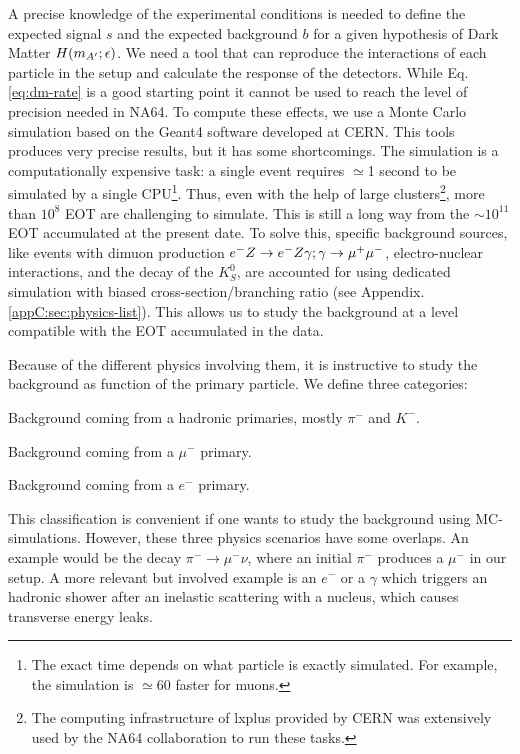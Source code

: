 A precise knowledge of the experimental conditions is needed to define the expected signal $s$ and the expected background $b$ for a given hypothesis of Dark Matter $H(m_{A'};\epsilon)$. We need a tool that can reproduce the interactions of each particle in the setup and calculate the response of the detectors. While Eq.\ref{eq:dm-rate} is a good starting point it cannot be used to reach the level of precision needed in NA64. To compute these effects, we use a Monte Carlo simulation based on the Geant4 software \cite{AGOSTINELLI2003250,1610988} developed at CERN. This tools produces very precise results, but it has some shortcomings. The simulation is a computationally expensive task: a single event requires $\simeq$1 second to be simulated by a single CPU\footnote{The exact time depends on what particle is exactly simulated. For example, the simulation is $\simeq$60 faster for muons.}. Thus, even with the help of large clusters\footnote{The computing infrastructure of lxplus provided by CERN was extensively used by the NA64 collaboration to run these tasks.}, more than $10^8$ EOT are challenging to simulate. This is still a long way from the $\sim 10^{11}$ EOT accumulated at the present date. 
To solve this, specific background sources, like events with dimuon production $e^- Z \to e^- Z \gamma; \gamma \to \mu^+ \mu^-$, electro-nuclear interactions, and the decay of the $K^0_S$, are accounted for using dedicated simulation with biased cross-section/branching ratio (see Appendix.\ref{appC:sec:physics-list}). This allows us to study the background at a level compatible with the EOT accumulated in the data.

Because of the different physics involving them, it is instructive to study the background as function of the primary particle. We define three categories:
\begin{description}[leftmargin=!,labelwidth=\widthof{\bfseries Electronic background}]
\item[Hadronic background] Background coming from a hadronic primaries, mostly $\pi^-$ and $K^-$.
\item[Muonic background] Background coming from a $\mu^-$ primary.
\item[Electronic background] Background coming from a $e^-$ primary.
\end{description}
This classification is convenient if one wants to study the background using MC-simulations. However, these three physics scenarios have some overlaps. An example would be the decay $\pi^- \rightarrow \mu^-\nu$, where an initial $\pi^-$ produces a $\mu^-$ in our setup. A more relevant but involved example is an $e^-$ or a $\gamma$ which triggers an hadronic shower after an inelastic scattering with a nucleus, which causes transverse energy leaks.

